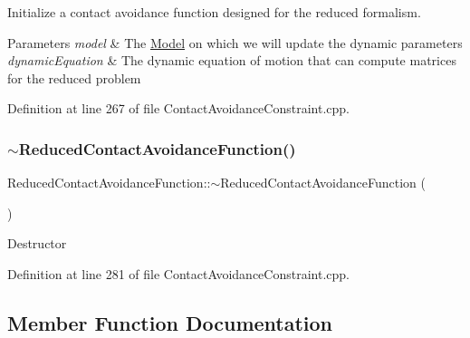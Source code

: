 Initialize a contact avoidance function designed for the reduced formalism.


\begin{DoxyParams}{Parameters}
{\em model} & The \hyperlink{classocra_1_1Model}{Model} on which we will update the dynamic parameters \\
\hline
{\em dynamic\+Equation} & The dynamic equation of motion that can compute matrices for the reduced problem \\
\hline
\end{DoxyParams}


Definition at line 267 of file Contact\+Avoidance\+Constraint.\+cpp.

\hypertarget{classocra_1_1ReducedContactAvoidanceFunction_a7a1844143947f714f2e0207d9f56834a}{}\label{classocra_1_1ReducedContactAvoidanceFunction_a7a1844143947f714f2e0207d9f56834a} 
\subsubsection{\texorpdfstring{$\sim$\+Reduced\+Contact\+Avoidance\+Function()}{~ReducedContactAvoidanceFunction()}}
{\footnotesize\ttfamily Reduced\+Contact\+Avoidance\+Function\+::$\sim$\+Reduced\+Contact\+Avoidance\+Function (\begin{DoxyParamCaption}{ }\end{DoxyParamCaption})}

Destructor 

Definition at line 281 of file Contact\+Avoidance\+Constraint.\+cpp.



\subsection{Member Function Documentation}
\hypertarget{classocra_1_1ReducedContactAvoidanceFunction_ac39227a19a650de28f4ae603511bfb73}{}\label{classocra_1_1ReducedContactAvoidanceFunction_ac39227a19a650de28f4ae603511bfb73} 
